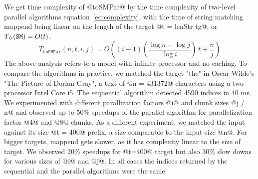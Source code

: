 We get time complexity of @toSMPar@ by the time complexity of
two-level parallel algorithms equation~\ref{eq:complexity},
with the time of string matching mappend being linear on the length
of the target @t = lenStr tg@, or
$T_{\diamondsuit}(\texttt{SM})= O(t)$.
%
$$
T_\texttt{toSMPar} (n, t, i, j) =
O((i-1)(\frac{\log n - \log j}{\log i})\ t  + \frac{n}{j})
$$
%
The above analysis refers to a model with infinite processor and no caching.
To compare the algorithms in practice,
we matched the target "the"
in  Oscar Wilde's "The Picture of Dorian Gray", a text of @n = 431372@ characters
using a two processor Intel Core i5.
%
The sequential algorithm detected 4590 indices in 40 ms.
%
We experimented with different parallization factors @i@ and chunk sizes @j / n@
and observed up to $50\%$ speedups of the parallel algorithm for parallelization factor
@4@ and @8@ chunks.
%
As a different experiment, we matched the input against its size @t = 400@ prefix,
a size comparable to the input size @n@.
%
For bigger targets,
mappend gets slower, as it has complexity linear to the size of target.
%
We observed $20\%$ speedups for @t=400@ target but also $30\%$ slow downs for various sizes of @i@ and @j@.
%
In all cases the indices returned by the sequential and the parallel algorithms were the same.

